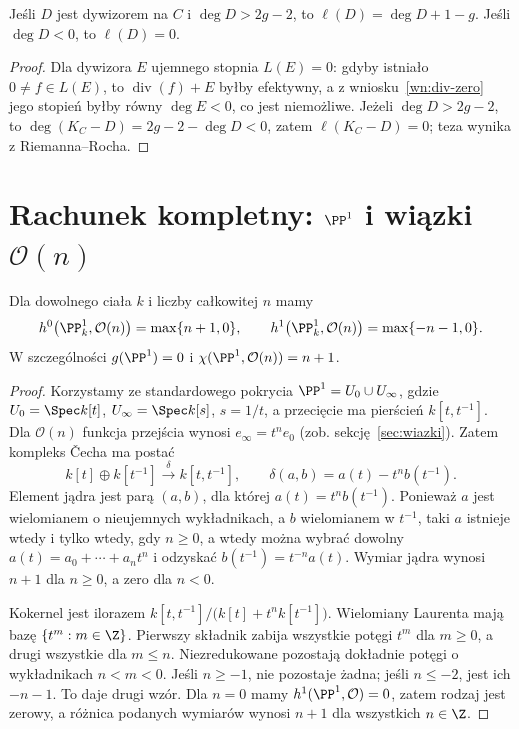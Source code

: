 \begin{wniosek}
Jeśli $D$ jest dywizorem na $C$ i $\deg D>2g-2$,
to $\ell(D)=\deg D+1-g$.
Jeśli $\deg D<0$, to $\ell(D)=0$.
\end{wniosek}
\begin{proof}
Dla dywizora $E$ ujemnego stopnia $L(E)=0$:
gdyby istniało $0\ne f\in L(E)$, to
$\operatorname{div}(f)+E$ byłby efektywny,
a z wniosku~\ref{wn:div-zero} jego stopień byłby
równy $\deg E<0$, co jest niemożliwe.
Jeżeli $\deg D>2g-2$, to
$\deg(K_C-D)=2g-2-\deg D<0$,
zatem $\ell(K_C-D)=0$; teza wynika z Riemanna--Rocha.
\end{proof}

\section{Rachunek kompletny: \texorpdfstring{$\PP^1$}{P1} i wiązki \texorpdfstring{$\mathcal O(n)$}{O(n)}}
\label{sec:pp1-rr}

\begin{twierdzenie}
\label{tw:p1-coh}
Dla dowolnego ciała $k$ i liczby całkowitej $n$
mamy
\[
 h^0\bigl(\PP^1_k,\mathcal O(n)\bigr)=\max\{n+1,0\},\qquad
 h^1\bigl(\PP^1_k,\mathcal O(n)\bigr)=\max\{-n-1,0\}.
\]
W szczególności $g(\PP^1)=0$ i
$\chi(\PP^1,\mathcal O(n))=n+1$.
\end{twierdzenie}
\begin{proof}
Korzystamy ze standardowego pokrycia
$\PP^1=U_0\cup U_\infty$, gdzie
$U_0=\Spec k[t]$, $U_\infty=\Spec k[s]$,
$s=1/t$, a przecięcie ma pierścień
$k[t,t^{-1}]$. Dla $\mathcal O(n)$
funkcja przejścia wynosi $e_\infty=t^ne_0$
(zob. sekcję~\ref{sec:wiazki}). Zatem kompleks
Čecha ma postać
\[
 k[t]\oplus k[t^{-1}]
 \xrightarrow{\delta}
 k[t,t^{-1}],\qquad
 \delta(a,b)=a(t)-t^n b(t^{-1}).
\]
Element jądra jest parą $(a,b)$, dla której
$a(t)=t^n b(t^{-1})$. Ponieważ $a$ jest
wielomianem o nieujemnych wykładnikach,
a $b$ wielomianem w $t^{-1}$,
taki $a$ istnieje wtedy i tylko wtedy, gdy
$n\ge0$, a wtedy można wybrać dowolny
$a(t)=a_0+\cdots+a_nt^n$ i odzyskać
$b(t^{-1})=t^{-n}a(t)$. Wymiar jądra wynosi
$n+1$ dla $n\ge0$, a zero dla $n<0$.

Kokernel jest ilorazem
$k[t,t^{-1}]/\bigl(k[t]+t^n k[t^{-1}]\bigr)$.
Wielomiany Laurenta mają bazę $\{t^m:m\in\Z\}$.
Pierwszy składnik zabija wszystkie potęgi
$t^m$ dla $m\ge0$, a drugi wszystkie dla
$m\le n$. Niezredukowane pozostają dokładnie
potęgi o wykładnikach $n<m<0$.
Jeśli $n\ge-1$, nie pozostaje żadna;
jeśli $n\le-2$, jest ich $-n-1$.
To daje drugi wzór. Dla $n=0$ mamy
$h^1(\PP^1,\mathcal O)=0$, zatem rodzaj jest zerowy,
a różnica podanych wymiarów wynosi $n+1$
dla wszystkich $n\in\Z$.
\end{proof}

